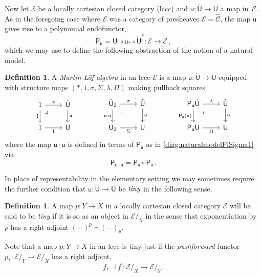 \documentclass[12pt,reqno]{amsart}
\newcommand{\CC}{\ensuremath{\mathcal{C}}}
\newcommand{\EE}{\ensuremath{\mathcal{E}}}
\newcommand{\alg}[1]{\ensuremath{\mathsf{#1}}}
\renewcommand{\to}{\ensuremath{\rightarrow}}
\newcommand{\too}{\ensuremath{\longrightarrow}}
\renewcommand{\t}{\ensuremath{\mathsf{u}}}
\newcommand{\T}{\ensuremath{\mathsf{U}}}
\newcommand{\TT}{\ensuremath{\dot{\mathsf{U}}}}
\newcommand{\tT}{\ensuremath{{\t}:\TT\to\T}}
\newcommand{\pbcorner}{\arrow[dr,phantom,"\lrcorner" very near start, shift right=.5ex]} %
\theoremstyle{remark}
\theoremstyle{definition}
\newtheorem{definition}[theorem]{Definition}
\begin{document}
Now let $\EE$ be a locally cartesian closed category (lccc) and $\tT$ a map in~$\EE$.  As in the foregoing case where $\EE$ was a category of presheaves $\EE=\widehat{\CC}$, the map $\t$ gives rise to a polynomial endofunctor,
$$\alg{P}_\t = \T_! \circ \t_* \circ \TT^* : \EE\too\EE\,,$$
which we may use to define the following abstraction of the notion of a natural model.
\begin{definition}\label{def:MLalg}
A \emph{Martin-L\"of algebra} in an lccc $\EE$ is a map $\tT$ equipped with structure maps $(*, 1, \sigma, \Sigma, \lambda, \Pi)$ making pullback squares 
\begin{equation}\label{diag:MLalg}
\begin{tikzcd}
	1 \ar[r,"*"] \ar[d,swap,"!"] \pbcorner &  \TT \ar[d, "\t"]\\  
	1 \ar[r, swap,"\mathsf{1}"] & \T
 \end{tikzcd}\qquad \qquad 
 \begin{tikzcd}
	\TT_2  \ar[r,"\sigma"] \ar[d,swap,"\t\cdot\t"] \pbcorner &  \TT \ar[d, "\t"]\\  
	\T_2 \ar[r,swap, "\Sigma"] & \T
\end{tikzcd} \qquad \qquad 
	 \begin{tikzcd}
	\alg{P}_\t\TT \ar[r,"\lambda"] \ar[d,swap,"\alg{P}_\t(\t)"] \pbcorner &  \TT \ar[d, "\t"]\\  
	\alg{P}_\t\T \ar[r,swap, "\Pi"] & \T
 \end{tikzcd} 
 \end{equation}
 where the map $\t\cdot\t$ is defined in terms of $\alg{P}_\t$ as in \eqref{diag:naturalmodelPiSigma1} via
 \[
\alg{P}_{\t\cdot\t} = \alg{P}_{\t}\circ \alg{P}_{\t}\,.
 \]
   \end{definition}

In place of representability in the elementary setting we may sometimes require the further condition that $\tT$ be $\emph{tiny}$ in the following sense.

\begin{definition}\label{def:tinymap}
 A map $p : Y \to X$ in a locally cartesian closed category $\EE$ will be said to be \emph{tiny} if it is so as an object in $\EE/_{\!X}$ in the sense that exponentiation by $p$ has a right adjoint $(-)^p \dashv (-)_p$. 
\end{definition}

Note that a map $p : Y \to X$ in an lccc is tiny just if the \emph{pushforward} functor $p_* : \EE/_Y \to \EE/_X$ has a right adjoint,
\[
f_* \dashv f^! : \EE/_X \too \EE/_Y\,.
\]
\end{document}

